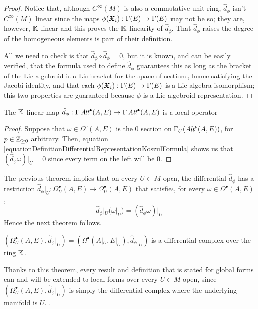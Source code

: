 \begin{proof}
Notice that, although $C^\infty(M)$ is also a commutative unit ring, $\hat d_\phi$ isn't $C^\infty(M)$ linear since the maps $\phi(\sectoid X_i): \Gamma(E) \to \Gamma(E)$ may not be so; they are, however, $\mathbb{K}$-linear and this proves the $\mathbb{K}$-linearity of $\hat d_\phi$. That $\hat d_\phi$ raises the degree of the homogeneous elements is part of their definition. 

All we need to check is that $\hat d_\phi \circ \hat d_\phi = 0$, but it is known, and can be easily verified, that the formula used to define $\hat d_\phi$ guarantees this as long as the bracket of the Lie algebroid is a Lie bracket for the space of sections, hence satisfying the Jacobi identity, and that each $\phi(\sectoid X_i): \Gamma(E) \to \Gamma(E)$ is a Lie algebra isomorphism; this two properties are guaranteed because $\phi$ is a Lie algebroid representation.
\end{proof}

\begin{theorem}\label{theoDifferentialLocal}
The $\mathbb{K}$-linear map $\hat d_\phi : \Gamma \Alt^\bullet(A, E) \to \Gamma \Alt^\bullet(A, E)$ is a local operator
\end{theorem}
\begin{proof}
Suppose that $\omega \in \Omega^p(A, E)$ is the $0$ section on $\Gamma_U(\operatorname{\textit{Alt}}^p(A, E))$, for $p \in \mathbb{Z}_{\geq 0}$ arbitrary. Then, equation \ref{equationDefinitionDifferentialRepresentationKoszulFormula} shows us that $(\hat d_\phi \omega)|_U = 0$ since every term on the left will be $0$.
\end{proof}


The previous theorem implies that on every $U \subset M$ open, the differential $\hat d_\phi$ has a restriction $\hat d_\phi|_U: \Omega_U^\bullet(A, E) \to \Omega_U^\bullet(A, E)$ that satisfies, for every $\omega \in \Omega^\bullet(A, E)$, 
    \begin{equation} \label{equationRestrictionOfDifferentialLocalOperatorGoodRestriction}
        \hat d_\phi|_U( \omega|_U) = (\hat d_\phi \omega)|_U
    \end{equation} 
Hence the next theorem follows.


\begin{theorem}
$(\Omega_U^\bullet(A, E), \hat d_\phi|_U)  = (\Omega^\bullet(A|_U, E|_U), \hat d_\phi|_U)$ is a differential complex over the ring $\mathbb{K}$.
\end{theorem}

\begin{remark}
Thanks to this theorem, every result and definition that is stated for global forms can and will be extended to local forms over every $U \subset M$ open, since $(\Omega_U^\bullet(A, E), \hat d_\phi|_U)$ is simply the differential complex where the underlying manifold is $U$. .
\end{remark}

